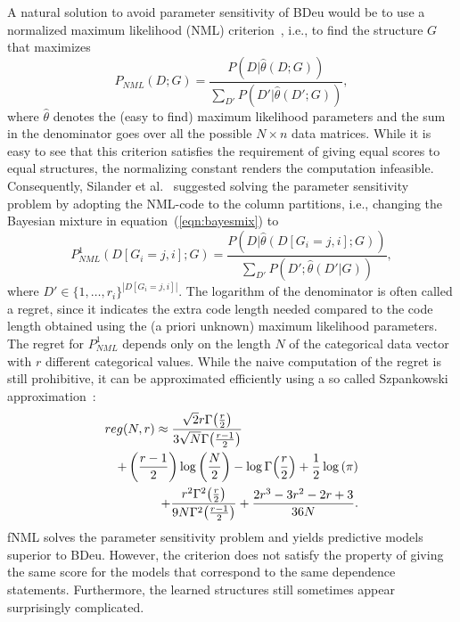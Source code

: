 \documentclass[letterpaper]{article}
\begin{document}
A natural solution to avoid parameter sensitivity of BDeu would be to
use a normalized maximum likelihood (NML)
criterion~\cite{Shta87,Riss96a}, i.e., to find the structure $G$ that
maximizes
\begin{equation}
P_{NML}(D;G)=\frac{P(D|\hat\theta(D;G))}{\sum_{D'}{P(D'|\hat\theta(D';G))}},
\end{equation}
where $\hat\theta$ denotes the (easy to find) maximum likelihood
parameters and the sum in the denominator goes over all the possible
$N\times n$ data matrices. While it is easy to see that this criterion
satisfies the requirement of giving equal scores to equal structures,
the normalizing constant renders the computation
infeasible. Consequently, Silander et al.~\cite{cosco.pgm08a}
suggested solving the parameter sensitivity problem by adopting the
NML-code to the column partitions, i.e., changing the Bayesian mixture
in equation~(\ref{eqn:bayesmix}) to
\begin{equation}
P^1_{NML}(D[G_i=j,i];G)=\frac{P(D|\hat\theta(D[G_i=j,i];G))}{\sum_{D'}{P(D';\hat\theta(D'|G))}},
\end{equation}
where $D'\in{\{1,\ldots,r_i\}}^{|D[G_i=j,i]|}$.  The logarithm of the
denominator is often called a regret, since it indicates the extra
code length needed compared to the code length obtained using the (a
priori unknown) maximum likelihood parameters. The regret for
$P^1_{NML}$ depends only on the length $N$ of the categorical data
vector with $r$ different categorical values.  While the naive
computation of the regret is still prohibitive, it can be approximated
efficiently using a so called Szpankowski
approximation~\cite{cosco.aistat03}:
\begin{eqnarray}
\label{eqn:szp}
\lefteqn{reg(N,r) \approx \frac{\sqrt{2} r \Gamma{\left(\frac{r}{2} \right)}}{3 \sqrt{N} \Gamma{\left(\frac{r-1}{2}  \right)}}} \\
 &&+ \left(\frac{r-1}{2}\right) \log{\left (\frac{N}{2} \right )}- \log \Gamma{\left(\frac{r}{2} \right)} + \frac{1}{2} \log{\left (\pi \right )}\nonumber\\
 &&+ \frac{r^{2} \Gamma^{2}{\left(\frac{r}{2} \right)}}{9N \Gamma^{2}{\left(\frac{r-1}{2}\right)}} + \frac{2r^3-3r^2-2r+3}{36N}\nonumber.
\end{eqnarray}
fNML solves the parameter sensitivity problem and yields predictive
models superior to BDeu.  However, the criterion does not satisfy the
property of giving the same score for the models that correspond to
the same dependence statements. Furthermore, the learned structures
still sometimes appear surprisingly complicated.
 
\end{document}
